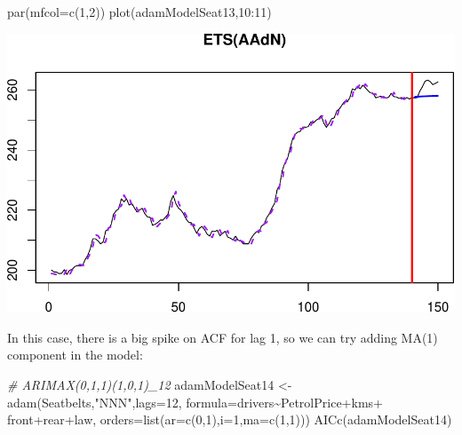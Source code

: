 \documentclass[
]{book}
\newenvironment{Shaded}{\begin{snugshade}}{\end{snugshade}}
\newcommand{\AttributeTok}[1]{\textcolor[rgb]{0.77,0.63,0.00}{#1}}
\newcommand{\CommentTok}[1]{\textcolor[rgb]{0.56,0.35,0.01}{\textit{#1}}}
\newcommand{\DecValTok}[1]{\textcolor[rgb]{0.00,0.00,0.81}{#1}}
\newcommand{\FunctionTok}[1]{\textcolor[rgb]{0.00,0.00,0.00}{#1}}
\newcommand{\NormalTok}[1]{#1}
\newcommand{\OtherTok}[1]{\textcolor[rgb]{0.56,0.35,0.01}{#1}}
\newcommand{\SpecialCharTok}[1]{\textcolor[rgb]{0.00,0.00,0.00}{#1}}
\newcommand{\StringTok}[1]{\textcolor[rgb]{0.31,0.60,0.02}{#1}}
\theoremstyle{definition}
\theoremstyle{definition}
\theoremstyle{definition}
\theoremstyle{definition}
\theoremstyle{remark}
\begin{document}
\begin{Shaded}
\begin{Highlighting}[]
\FunctionTok{par}\NormalTok{(}\AttributeTok{mfcol=}\FunctionTok{c}\NormalTok{(}\DecValTok{1}\NormalTok{,}\DecValTok{2}\NormalTok{))}
\FunctionTok{plot}\NormalTok{(adamModelSeat13,}\DecValTok{10}\SpecialCharTok{:}\DecValTok{11}\NormalTok{)}
\end{Highlighting}
\end{Shaded}

\includegraphics{adam_files/figure-latex/unnamed-chunk-157-1.pdf}

In this case, there is a big spike on ACF for lag 1, so we can try adding MA(1) component in the model:

\begin{Shaded}
\begin{Highlighting}[]
\CommentTok{\# ARIMAX(0,1,1)(1,0,1)\_12}
\NormalTok{adamModelSeat14 }\OtherTok{\textless{}{-}} \FunctionTok{adam}\NormalTok{(Seatbelts,}\StringTok{"NNN"}\NormalTok{,}\AttributeTok{lags=}\DecValTok{12}\NormalTok{,}
                        \AttributeTok{formula=}\NormalTok{drivers}\SpecialCharTok{\textasciitilde{}}\NormalTok{PetrolPrice}\SpecialCharTok{+}\NormalTok{kms}\SpecialCharTok{+}
\NormalTok{                          front}\SpecialCharTok{+}\NormalTok{rear}\SpecialCharTok{+}\NormalTok{law,}
                        \AttributeTok{orders=}\FunctionTok{list}\NormalTok{(}\AttributeTok{ar=}\FunctionTok{c}\NormalTok{(}\DecValTok{0}\NormalTok{,}\DecValTok{1}\NormalTok{),}\AttributeTok{i=}\DecValTok{1}\NormalTok{,}\AttributeTok{ma=}\FunctionTok{c}\NormalTok{(}\DecValTok{1}\NormalTok{,}\DecValTok{1}\NormalTok{)))}
\FunctionTok{AICc}\NormalTok{(adamModelSeat14)}
\end{Highlighting}
\end{Shaded}
\end{document}
